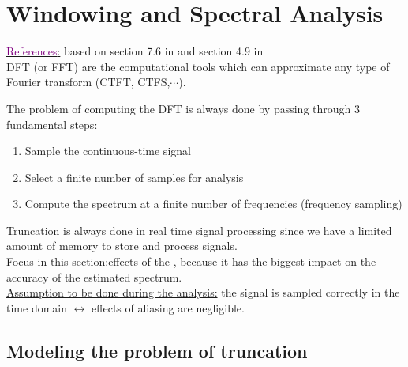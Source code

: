 

\chapter{Windowing and Spectral Analysis}
\label{Chap:Windowing}

\underline{\textcolor{purple}{References}:} based on section 7.6 in \cite{DSP_DimitrisManolakis} and section 4.9 in \cite{signal_processing_Lathi}\\

DFT (or FFT) are the computational tools which can approximate any type of Fourier transform (CTFT, CTFS,$\cdots$).

The problem of computing the DFT is always done by passing through 3 fundamental steps:

	\begin{enumerate}
	\item Sample the continuous-time signal
	
	\item Select a finite number of samples for analysis
	
	\item Compute the spectrum at a finite
number of frequencies (frequency sampling)
	\end{enumerate}

Truncation is always done in real time signal processing since we have a limited amount of memory to store and process signals.\\

Focus in this section:effects of the , because it
has the biggest impact on the accuracy of the estimated spectrum.\\

\underline{Assumption to be done during the analysis:}  the signal is sampled correctly in the time domain $\leftrightarrow$ effects of aliasing are negligible.


\section{Modeling the problem of truncation}

